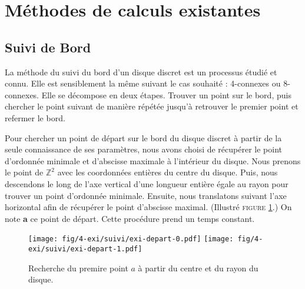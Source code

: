 \section{Méthodes de calculs existantes}

\subsection{Suivi de Bord}

La méthode du suivi du bord d'un disque discret est un processus étudié et connu. Elle est sensiblement la même suivant le cas souhaité : 4-connexes ou 8-connexes. Elle se décompose en deux étapes. Trouver un point sur le bord, puis chercher le point suivant de manière répétée jusqu'à retrouver le premier point et refermer le bord.


Pour chercher un point de départ sur le bord du disque discret à partir de la seule connaissance de ses paramètres, nous avons choisi de récupérer le point d'ordonnée minimale et d'abscisse maximale à l'intérieur du disque. Nous prenons le point de $\mathbb{Z}^2$ avec les coordonnées entières du centre du disque. Puis, nous descendons le long de l'axe vertical d'une longueur entière égale au rayon pour trouver un point d'ordonnée minimale. Ensuite, nous translatons suivant l'axe horizontal afin de récupérer le point d'abscisse maximal. (Illustré \textsc{figure} \ref{fig:depart}.) On note \textbf{a} ce point de départ. Cette procédure prend un temps constant. 

\begin{figure}[H]
  \centering
  \texttt{[image: fig/4-exi/suivi/exi-depart-0.pdf]}
  \texttt{[image: fig/4-exi/suivi/exi-depart-1.pdf]}
  \caption{Recherche du premire point $a$ à partir du centre et du rayon du disque.}
\label{fig:depart}
\end{figure}
  


